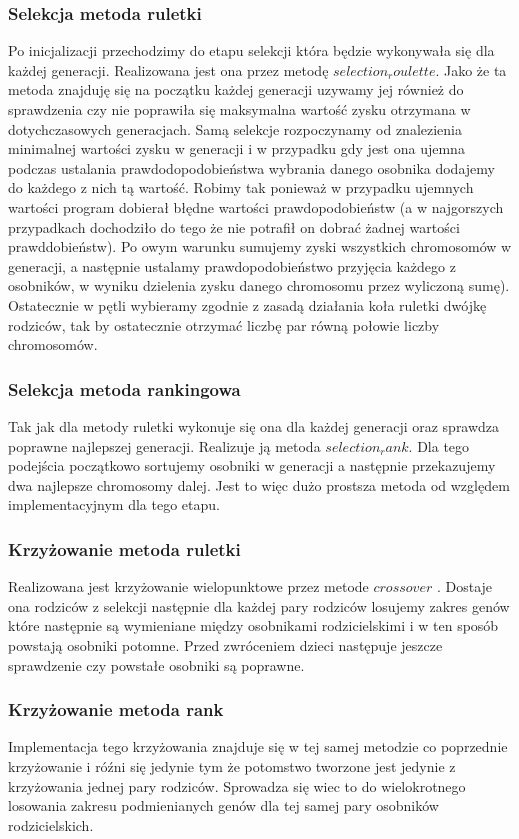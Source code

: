 \documentclass{article}
\begin{document}
\subsubsection{Selekcja metoda ruletki}
Po inicjalizacji przechodzimy do etapu selekcji która będzie wykonywała się dla każdej generacji. Realizowana jest ona przez metodę $selection_roulette$. Jako że ta metoda znajduję się na początku każdej generacji uzywamy jej również do sprawdzenia czy nie poprawiła się maksymalna wartość zysku otrzymana w dotychczasowych generacjach. Samą selekcje rozpoczynamy od znalezienia minimalnej wartości zysku w generacji i w przypadku gdy jest ona ujemna  podczas ustalania prawdodopodobieństwa wybrania danego osobnika dodajemy do każdego z nich tą wartość. Robimy tak ponieważ w przypadku ujemnych wartości program dobierał błędne wartości prawdopodobieństw (a w najgorszych przypadkach dochodziło do tego że nie potrafił on dobrać żadnej wartości prawddobieństw). Po owym warunku sumujemy zyski wszystkich chromosomów w generacji, a następnie ustalamy prawdopodobieństwo przyjęcia każdego z osobników, w wyniku dzielenia zysku danego chromosomu przez wyliczoną sumę). Ostatecznie w pętli wybieramy zgodnie z zasadą działania koła ruletki dwójkę rodziców, tak by ostatecznie otrzymać liczbę par równą połowie liczby chromosomów.

\subsubsection{Selekcja metoda rankingowa}
Tak jak dla metody ruletki wykonuje się ona dla każdej generacji oraz sprawdza poprawne najlepszej generacji. Realizuje ją metoda $selection_rank$. Dla tego podejścia początkowo sortujemy osobniki w  generacji a następnie przekazujemy dwa najlepsze chromosomy dalej.
Jest to więc dużo prostsza metoda od względem implementacyjnym dla tego etapu.

\subsubsection{Krzyżowanie metoda ruletki}
Realizowana jest krzyżowanie wielopunktowe przez metode $crossover$ . Dostaje ona rodziców z selekcji następnie dla każdej pary rodziców losujemy zakres genów które następnie są wymieniane między osobnikami rodzicielskimi i w ten sposób powstają osobniki potomne. Przed zwróceniem dzieci następuje jeszcze sprawdzenie czy powstałe osobniki są poprawne.

\subsubsection{Krzyżowanie metoda rank}
Implementacja tego krzyżowania znajduje się w tej samej metodzie co poprzednie krzyżowanie i róźni się jedynie tym że potomstwo tworzone jest jedynie z krzyżowania jednej pary rodziców. Sprowadza się wiec to do wielokrotnego losowania zakresu podmienianych genów dla tej samej pary osobników rodzicielskich.
\end{document}
